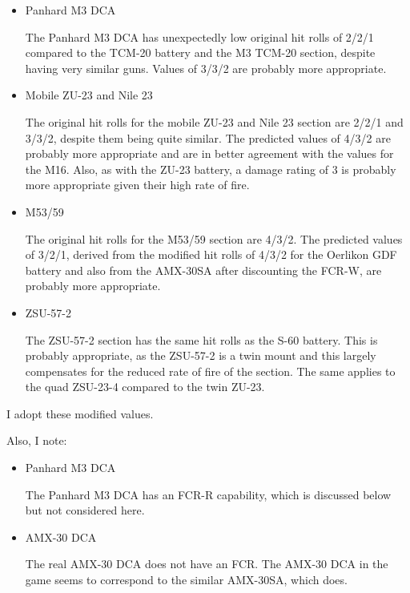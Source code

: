 {\begin{itemize}
        \item Panhard M3 DCA

            The Panhard M3 DCA has unexpectedly low original hit rolls of 2/2/1 compared to the TCM-20 battery and the M3 TCM-20 section, despite having very similar guns. Values of 3/3/2 are probably more appropriate.

        \item Mobile ZU-23 and Nile 23

            The original hit rolls for the mobile ZU-23 and Nile 23 section are 2/2/1 and 3/3/2, despite them being quite similar. The predicted values of 4/3/2 are probably more appropriate and are in better agreement with the values for the M16. Also, as with the ZU-23 battery, a damage rating of 3 is probably more appropriate given their high rate of fire.

        \item M53/59

            The original hit rolls for the M53/59 section are 4/3/2. The predicted values of 3/2/1, derived from the modified hit rolls of 4/3/2 for the Oerlikon GDF battery and also from the AMX-30SA after discounting the FCR-W, are probably more appropriate.

        \item ZSU-57-2

            The ZSU-57-2 section has the same hit rolls as the S-60 battery. This is probably appropriate, as the ZSU-57-2 is a twin mount and this largely compensates for the reduced rate of fire of the section. The same applies to the quad ZSU-23-4 compared to the twin ZU-23.
    \end{itemize}

    I adopt these modified values.

    Also, I note:

    \begin{itemize}

        \item Panhard M3 DCA

            The Panhard M3 DCA has an FCR-R capability, which is discussed below but not considered here.

        \item AMX-30 DCA

            The real AMX-30 DCA does not have an FCR. The AMX-30 DCA in the game seems to correspond to the similar AMX-30SA, which does.

    \end{itemize}

}

